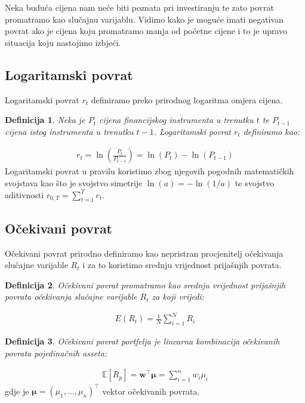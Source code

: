 \documentclass[zavrsnirad, upload]{fer}
\newtheorem{definition}{Definicija}
\begin{document}
\noindent Neka buduća cijena nam neće biti poznata pri investiranju te
zato povrat promatramo kao slučajnu varijablu.
Vidimo kako je moguće imati negativan povrat ako je cijena koju
promatramo manja od početne cijene i to je upravo situacija koju
nastojimo izbjeći.

\subsection{Logaritamski povrat}
Logaritamski povrat $r_t$ definiramo preko prirodnog logaritma omjera cijena.

\begin{definition}
    Neka je $P_t$ cijena financijskog instrumenta u trenutku $t$ te
    $P_{t-1}$ cijena istog instrumenta u trenutku $t-1$. Logaritamski povrat
    $r_t$ definiramo kao:
\end{definition}
\begin{align}
    r_t = \ln\left(\frac{P_t}{P_{t-1}}\right) = \ln(P_t) - \ln(P_{t-1})
\end{align}
\noindent Logaritamski povrat u pravilu koristimo zbog njegovih pogodnih
matematičkih svojstava kao što je svojstvo simetrije $\ln(a) = -\ln(1/a)$
te svojstvo aditivnosti $r_{0,T} = \sum_{t=1}^T r_t$.

\subsection{Očekivani povrat}
Očekivani povrat prirodno definiramo kao nepristran procjenitelj očekivanja
slučajne varijable $R_t$ i za to koristimo srednju vrijednost prijašnjih
povrata.
\label{sek:ocekivani_povrat}
\begin{definition}
	Očekivani povrat promatramo kao srednju vrijednost prijašnjih
	povrata očekivanja slučajne varijable $R_t$ za koji vrijedi:
\end{definition}
\begin{align}
	E(R_t) =\frac{1}{N} \sum_{i = 1}^{N} R_i
\end{align}
\begin{definition}
Očekivani povrat portfelja je linearna kombinacija očekivanih povrata pojedinačnih asseta:
\end{definition}
\begin{align}
\mathbb{E}[R_p] =
    \mathbf{w}^\intercal \boldsymbol{\mu} = \sum_{i=1}^n w_i \mu_i
\end{align}
\indent gdje je $\boldsymbol{\mu} = (\mu_1, \dots, \mu_n)^\intercal$ vektor očekivanih povrata.
\end{document}
